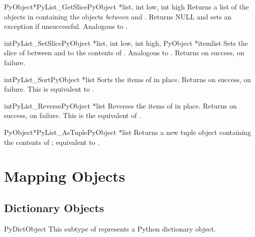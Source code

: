 \documentclass{manual}
\begin{document}
\begin{cfuncdesc}{PyObject*}{PyList_GetSlice}{PyObject *list,
                                              int low, int high}
Returns a list of the objects in  containing the objects 
\emph{between}  and .  Returns NULL and sets an
exception if unsuccessful.
Analogous to .
\end{cfuncdesc}

\begin{cfuncdesc}{int}{PyList_SetSlice}{PyObject *list,
                                        int low, int high,
                                        PyObject *itemlist}
Sets the slice of  between  and  to the
contents of .  Analogous to
.  Returns
 on success,  on failure.
\end{cfuncdesc}

\begin{cfuncdesc}{int}{PyList_Sort}{PyObject *list}
Sorts the items of  in place.  Returns  on success,
 on failure.  This is equivalent to
.
\end{cfuncdesc}

\begin{cfuncdesc}{int}{PyList_Reverse}{PyObject *list}
Reverses the items of  in place.  Returns  on
success,  on failure.  This is the equivalent of
.
\end{cfuncdesc}

\begin{cfuncdesc}{PyObject*}{PyList_AsTuple}{PyObject *list}
Returns a new tuple object containing the contents of ;
equivalent to .
\end{cfuncdesc}


\section{Mapping Objects \label{mapObjects}}



\subsection{Dictionary Objects \label{dictObjects}}

\begin{ctypedesc}{PyDictObject}
This subtype of  represents a Python dictionary object.
\end{ctypedesc}
\end{document}
